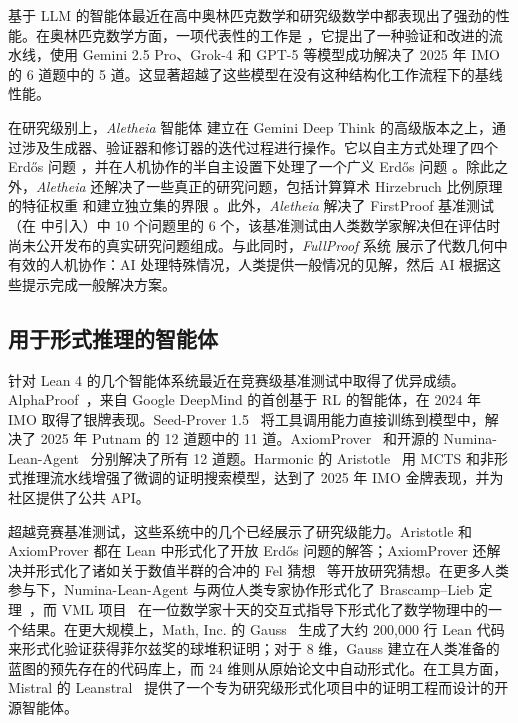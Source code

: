 ﻿\documentclass[]{pkuai4m}
\theoremstyle{plain}
\theoremstyle{definition}
\begin{document}
基于 LLM 的智能体最近在高中奥林匹克数学和研究级数学中都表现出了强劲的性能。在奥林匹克数学方面，一项代表性的工作是 \cite{huang2025winning}，它提出了一种验证和改进的流水线，使用 Gemini 2.5 Pro、Grok-4 和 GPT-5 等模型成功解决了 2025 年 IMO 的 6 道题中的 5 道。这显著超越了这些模型在没有这种结构化工作流程下的基线性能。

在研究级别上，\textit{Aletheia} 智能体 \cite{feng2026towards} 建立在 Gemini Deep Think 的高级版本之上，通过涉及生成器、验证器和修订器的迭代过程进行操作。它以自主方式处理了四个 Erdős 问题 \cite{feng2026semi}，并在人机协作的半自主设置下处理了一个广义 Erdős 问题 \cite{barreto2026irrationality}。除此之外，\textit{Aletheia} 还解决了一些真正的研究问题，包括计算算术 Hirzebruch 比例原理的特征权重 \cite{feng2026eigenweights} 和建立独立集的界限 \cite{lee2026lower}。此外，\textit{Aletheia} 解决了 FirstProof 基准测试 \cite{feng2026aletheia}（在 \cite{abouzaid2026first} 中引入）中 10 个问题里的 6 个，该基准测试由人类数学家解决但在评估时尚未公开发布的真实研究问题组成。与此同时，\textit{FullProof} 系统 \cite{bryan2026motivic} 展示了代数几何中有效的人机协作：AI 处理特殊情况，人类提供一般情况的见解，然后 AI 根据这些提示完成一般解决方案。

\subsection{用于形式推理的智能体}

针对 Lean 4 的几个智能体系统最近在竞赛级基准测试中取得了优异成绩。AlphaProof~\cite{hubert2025olympiad}，来自 Google DeepMind 的首创基于 RL 的智能体，在 2024 年 IMO 取得了银牌表现。Seed-Prover 1.5~\cite{chen2025seed} 将工具调用能力直接训练到模型中，解决了 2025 年 Putnam 的 12 道题中的 11 道。AxiomProver~\cite{breen2025ax} 和开源的 Numina-Lean-Agent~\cite{liu2026numina} 分别解决了所有 12 道题。Harmonic 的 Aristotle~\cite{achim2025aristotle} 用 MCTS 和非形式推理流水线增强了微调的证明搜索模型，达到了 2025 年 IMO 金牌表现，并为社区提供了公共 API。

超越竞赛基准测试，这些系统中的几个已经展示了研究级能力。Aristotle 和 AxiomProver 都在 Lean 中形式化了开放 Erd\H{o}s 问题的解答；AxiomProver 还解决并形式化了诸如关于数值半群的合冲的 Fel 猜想~\cite{chen2026fel} 等开放研究猜想。在更多人类参与下，Numina-Lean-Agent 与两位人类专家协作形式化了 Brascamp--Lieb 定理~\cite{liu2026numina}，而 VML 项目~\cite{ilin2026semi} 在一位数学家十天的交互式指导下形式化了数学物理中的一个结果。在更大规模上，Math, Inc. 的 Gauss~\cite{mathinc_spherepacking} 生成了大约 200,000 行 Lean 代码来形式化验证获得菲尔兹奖的球堆积证明；对于 8 维，Gauss 建立在人类准备的蓝图的预先存在的代码库上，而 24 维则从原始论文中自动形式化。在工具方面，Mistral 的 Leanstral~\cite{mistralai2026leanstral} 提供了一个专为研究级形式化项目中的证明工程而设计的开源智能体。
\end{document}
